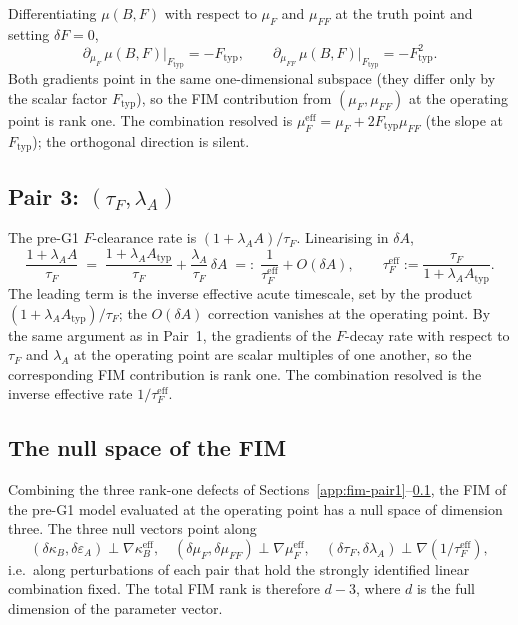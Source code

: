 Differentiating $\mu(B,F)$ with respect to $\mu_F$ and
$\mu_{FF}$ at the truth point and setting $\delta F = 0$,
\begin{equation*}
  \partial_{\mu_F}\,\mu(B,F)\big|_{F_{\mathrm{typ}}} = -F_{\mathrm{typ}},
  \qquad
  \partial_{\mu_{FF}}\,\mu(B,F)\big|_{F_{\mathrm{typ}}} = -F_{\mathrm{typ}}^2.
\end{equation*}
Both gradients point in the same one-dimensional subspace (they
differ only by the scalar factor $F_{\mathrm{typ}}$), so the FIM
contribution from $(\mu_F,\mu_{FF})$ at the operating point is rank
one. The combination resolved is
$\mu_F^{\mathrm{eff}} = \mu_F + 2 F_{\mathrm{typ}} \mu_{FF}$ (the
slope at $F_{\mathrm{typ}}$); the orthogonal direction is silent.

\subsection{Pair 3: \texorpdfstring{$(\tau_F, \lambda_A)$}{(tau\_F, lambda\_A)}}\label{app:fim-pair3}

The pre-G1 $F$-clearance rate is
$(1+\lambda_A A)/\tau_F$. Linearising in $\delta A$,
\begin{equation}
  \frac{1+\lambda_A A}{\tau_F}
   \;=\;
   \frac{1+\lambda_A A_{\mathrm{typ}}}{\tau_F}
   + \frac{\lambda_A}{\tau_F}\,\delta A
   \;=:\;
   \frac{1}{\tau_F^{\mathrm{eff}}} + O(\delta A),
  \qquad
  \tau_F^{\mathrm{eff}} := \frac{\tau_F}{1+\lambda_A A_{\mathrm{typ}}}.
  \label{eq:pair3-expand}
\end{equation}
The leading term is the inverse effective acute timescale, set by
the product $(1+\lambda_A A_{\mathrm{typ}})/\tau_F$; the $O(\delta A)$
correction vanishes at the operating point. By the same argument as
in Pair~1, the gradients of the $F$-decay rate with respect to
$\tau_F$ and $\lambda_A$ at the operating point are scalar multiples
of one another, so the corresponding FIM contribution is rank one.
The combination resolved is the inverse effective rate
$1/\tau_F^{\mathrm{eff}}$.

\subsection{The null space of the FIM}\label{app:fim-null}

Combining the three rank-one defects of
Sections~\ref{app:fim-pair1}--\ref{app:fim-pair3}, the FIM of the
pre-G1 model evaluated at the operating point has a null space of
dimension three. The three null vectors point along
\begin{equation}
  (\delta\kappa_B,\delta\varepsilon_A) \perp \nabla \kappa_B^{\mathrm{eff}},
  \quad
  (\delta\mu_F,\delta\mu_{FF}) \perp \nabla \mu_F^{\mathrm{eff}},
  \quad
  (\delta\tau_F,\delta\lambda_A) \perp \nabla(1/\tau_F^{\mathrm{eff}}),
  \label{eq:fim-nulls}
\end{equation}
i.e.\ along perturbations of each pair that hold the strongly
identified linear combination fixed. The total FIM rank is
therefore $d - 3$, where $d$ is the full dimension of the parameter
vector.

